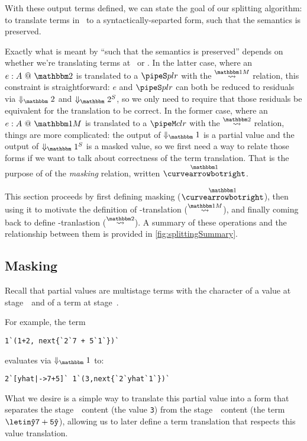 \begin{abstrsyn}
With these output terms defined, we can state the goal of our splitting algorithm:
to translate terms in \lang\ to a syntactically-separted form, 
such that the semantics is preserved.

Exactly what is meant by ``such that the semantics is preserved'' depends on whether we're translating
terms at \bbonem\ or \bbtwo.  
In the latter case, where an $\coltwo e A$ is translated to a $\pipeS p l r$ with the $\splitonesym$ relation,
this constraint is straightforward: $e$ and $\pipeS p l r$ can both be reduced to residuals
via $\redtwosym$ and $\sepredtwosym$, so we only need to require that those
residuals be equivalent for the translation to be correct.
In the former case, where an $\colone e A$ is translated to a $\pipeM c l r$ with the $\splittwosym$ relation, 
things are more complicated: 
the output of $\redonesym$ is a partial value and the output of $\sepredonesym$ is a masked value,
so we first need a way to relate those forms if we want to talk about correctness of the term translation.
That is the purpose of of the {\em masking} relation, written $\vsplito$.

This section proceeds by first defining masking ($\vsplito$), 
then using it to motivate the definition of \bbonem-translation ($\splitonesym$),
and finally coming back to define \bbtwo-tranlastion ($\splittwosym$).
A summary of these operations and the relationship between them is provided in \ref{fig:splittingSummary}.

\subsection{Masking}

Recall that partial values are multistage terms with the character of a value at stage~\bbone\ and of a term at stage~\bbtwo.

For example, the term
\begin{lstlisting}
1`(1+2, next{`2`7 + 5`1`})`
\end{lstlisting}
evaluates via $\redonesym$ to:
\begin{lstlisting}
2`[yhat|->7+5]` 1`(3,next{`2`yhat`1`})`
\end{lstlisting}

What we desire is a simple way to translate this partial value into a form that separates the stage~\bbone\ content (the value \texttt{3}) 
from the stage~\bbtwo\ content (the term $\letin \yhat {\mathtt{7+5}} \yhat$),
allowing us to later define a term translation that respects this value translation.


\end{abstrsyn}
